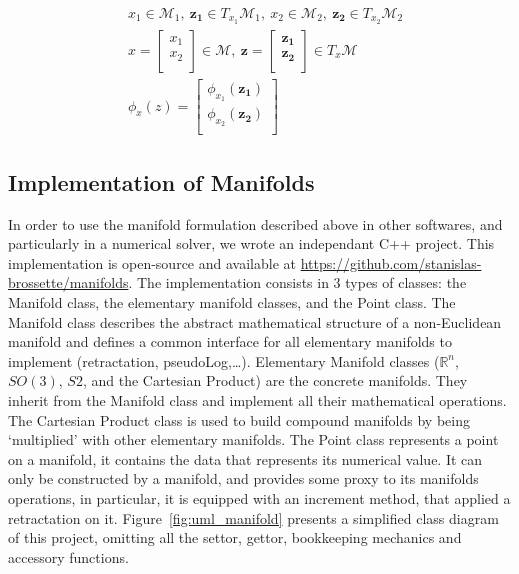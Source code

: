 \begin{align}
  &x_1\in \mathcal{M}_1,\ \mathbf{z_1}\in T_{x_1}\mathcal{M}_1,\ x_2\in \mathcal{M}_2,\ \mathbf{z_2}\in T_{x_2}\mathcal{M}_2\\
  &x=\begin{bmatrix}
    x_1\\x_2\\
  \end{bmatrix}\in \mathcal{M},\ \mathbf{z}=\begin{bmatrix}
    \mathbf{z_1}\\ \mathbf{z_2}\\
  \end{bmatrix}\in T_x\mathcal{M}\\
  &\phi_x(z) = \begin{bmatrix}
    \phi_{x_1}(\mathbf{z_1})\\
    \phi_{x_2}(\mathbf{z_2})\\
  \end{bmatrix}
\end{align}


\subsection{Implementation of Manifolds}
\label{sub:implementation_of_manifolds}

In order to use the manifold formulation described above in other softwares, and particularly in a numerical solver, we wrote an independant C++ project.
This implementation is open-source and available at \href{https://github.com/stanislas-brossette/manifolds}{https://github.com/stanislas-brossette/manifolds}.
The implementation consists in 3 types of classes: the Manifold class, the elementary manifold classes, and the Point class.
The Manifold class describes the abstract mathematical structure of a non-Euclidean manifold and defines a common interface for all elementary manifolds to implement (retractation, pseudoLog,\ldots).
Elementary Manifold classes ($\mathbb{R}^n$, $SO(3)$, $S2$, and the Cartesian Product) are the concrete manifolds.
They inherit from the Manifold class and implement all their mathematical operations.
The Cartesian Product class is used to build compound manifolds by being `multiplied' with other elementary manifolds.
The Point class represents a point on a manifold, it contains the data that represents its numerical value.
It can only be constructed by a manifold, and provides some proxy to its manifolds operations, in particular, it is equipped with an increment method, that applied a retractation on it.
Figure~\ref{fig:uml_manifold} presents a simplified class diagram of this project, omitting all the settor, gettor, bookkeeping mechanics and accessory functions.

